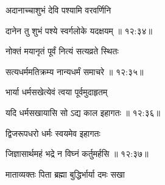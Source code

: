 {\devanagarifont अदानाच्चाशुभं देवि पश्यामि वरवर्णिनि \thinspace{\dandab} \dontdisplaylinenum }%


{\devanagarifont दानेन तु शुभं पश्ये स्वर्गलोके यदक्षयम् {॥ १२:३४॥} \veg\dontdisplaylinenum }%

{\devanagarifont नोक्तं मयानृतं पूर्वं नित्यं सत्यव्रते स्थितः \thinspace{\dandab} \dontdisplaylinenum }%


{\devanagarifont सत्यधर्ममतिक्रम्य नान्यधर्मं समाचरे {॥ १२:३५॥} \veg\dontdisplaylinenum }%

{\devanagarifont भार्या धर्मसखेत्येवं त्वया पूर्वमुदाहृतम् \thinspace{\dandab} \dontdisplaylinenum }%


{\devanagarifont यदि धर्मसखायासि सो ऽद्य काल इहागतः {॥ १२:३६॥} \veg\dontdisplaylinenum }%

{\devanagarifont द्विजरूपधरो धर्मः स्वयमेव इहागतः \thinspace{\dandab} \dontdisplaylinenum }%


{\devanagarifont जिज्ञासार्थमहं भद्रे न विघ्नं कर्तुमर्हसि {॥ १२:३७॥} \veg\dontdisplaylinenum }%

{\devanagarifont माताव्यक्तः पिता ब्रह्मा बुद्धिर्भार्या दमः सखा \thinspace{\dandab} \dontdisplaylinenum }%

